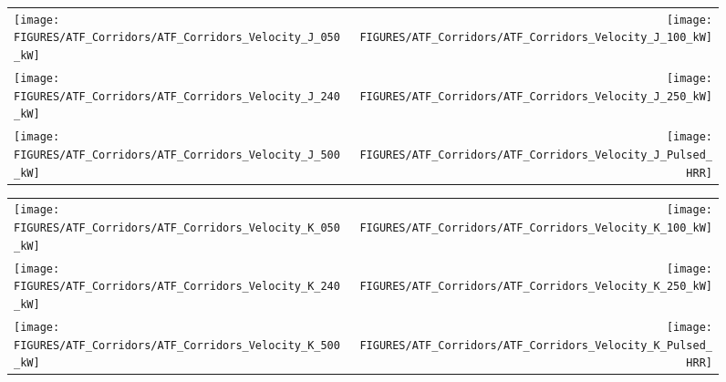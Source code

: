 \begin{figure}[p]
\begin{tabular*}{\textwidth}{l@{\extracolsep{\fill}}r}
\texttt{[image: FIGURES/ATF\_Corridors/ATF\_Corridors\_Velocity\_J\_050\_kW]} &
\texttt{[image: FIGURES/ATF\_Corridors/ATF\_Corridors\_Velocity\_J\_100\_kW]} \\
\texttt{[image: FIGURES/ATF\_Corridors/ATF\_Corridors\_Velocity\_J\_240\_kW]} &
\texttt{[image: FIGURES/ATF\_Corridors/ATF\_Corridors\_Velocity\_J\_250\_kW]} \\
\texttt{[image: FIGURES/ATF\_Corridors/ATF\_Corridors\_Velocity\_J\_500\_kW]} &
\texttt{[image: FIGURES/ATF\_Corridors/ATF\_Corridors\_Velocity\_J\_Pulsed\_HRR]}
\end{tabular*}
\label{ATF_Velocity_J}
\end{figure}

\begin{figure}[p]
\begin{tabular*}{\textwidth}{l@{\extracolsep{\fill}}r}
\texttt{[image: FIGURES/ATF\_Corridors/ATF\_Corridors\_Velocity\_K\_050\_kW]} &
\texttt{[image: FIGURES/ATF\_Corridors/ATF\_Corridors\_Velocity\_K\_100\_kW]} \\
\texttt{[image: FIGURES/ATF\_Corridors/ATF\_Corridors\_Velocity\_K\_240\_kW]} &
\texttt{[image: FIGURES/ATF\_Corridors/ATF\_Corridors\_Velocity\_K\_250\_kW]} \\
\texttt{[image: FIGURES/ATF\_Corridors/ATF\_Corridors\_Velocity\_K\_500\_kW]} &
\texttt{[image: FIGURES/ATF\_Corridors/ATF\_Corridors\_Velocity\_K\_Pulsed\_HRR]}
\end{tabular*}
\label{ATF_Velocity_K}
\end{figure}

